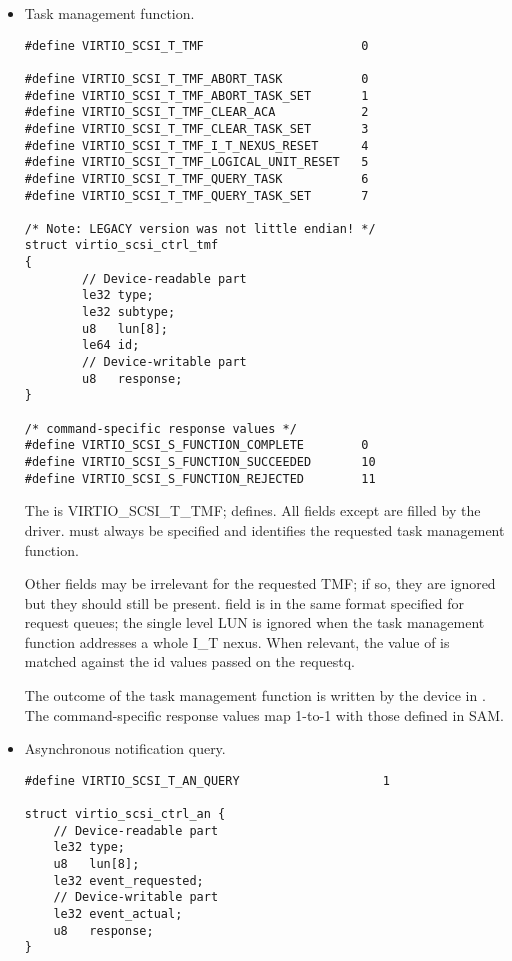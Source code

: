 \begin{itemize}
\item Task management function.
\begin{lstlisting}
#define VIRTIO_SCSI_T_TMF                      0

#define VIRTIO_SCSI_T_TMF_ABORT_TASK           0
#define VIRTIO_SCSI_T_TMF_ABORT_TASK_SET       1
#define VIRTIO_SCSI_T_TMF_CLEAR_ACA            2
#define VIRTIO_SCSI_T_TMF_CLEAR_TASK_SET       3
#define VIRTIO_SCSI_T_TMF_I_T_NEXUS_RESET      4
#define VIRTIO_SCSI_T_TMF_LOGICAL_UNIT_RESET   5
#define VIRTIO_SCSI_T_TMF_QUERY_TASK           6
#define VIRTIO_SCSI_T_TMF_QUERY_TASK_SET       7

/* Note: LEGACY version was not little endian! */
struct virtio_scsi_ctrl_tmf
{
        // Device-readable part
        le32 type;
        le32 subtype;
        u8   lun[8];
        le64 id;
        // Device-writable part
        u8   response;
}

/* command-specific response values */
#define VIRTIO_SCSI_S_FUNCTION_COMPLETE        0
#define VIRTIO_SCSI_S_FUNCTION_SUCCEEDED       10
#define VIRTIO_SCSI_S_FUNCTION_REJECTED        11
\end{lstlisting}

  The  is VIRTIO_SCSI_T_TMF;  defines. All
  fields except  are filled by the driver. 
  must always be specified and identifies the requested
  task management function.

  Other fields may be irrelevant for the requested TMF; if so,
  they are ignored but they should still be present. 
  field is in the same format specified for request queues; the
  single level LUN is ignored when the task management function
  addresses a whole I_T nexus. When relevant, the value of 
  is matched against the id values passed on the requestq.

  The outcome of the task management function is written by the
  device in . The command-specific response
  values map 1-to-1 with those defined in SAM.

\item Asynchronous notification query.
\begin{lstlisting}
#define VIRTIO_SCSI_T_AN_QUERY                    1

struct virtio_scsi_ctrl_an {
    // Device-readable part
    le32 type;
    u8   lun[8];
    le32 event_requested;
    // Device-writable part
    le32 event_actual;
    u8   response;
}


\end{lstlisting}
\end{itemize}
